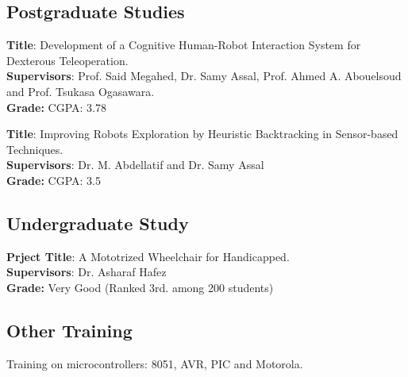 \documentclass[
  a4paper,
   maincolor=cvblue,
   sectioncolor=cvblue,
]{fortysecondscv}
\begin{document}
\subsection{Postgraduate Studies}
\begin{cvtable}
		{\textbf{Title}: Development of a Cognitive Human-Robot Interaction System for Dexterous Teleoperation.\\
		\textbf{Supervisors}: Prof. Said Megahed, Dr. Samy Assal, Prof. Ahmed A. Abouelsoud and Prof. Tsukasa Ogasawara.\\
		\textbf{Grade: }CGPA: 3.78\\
		   }

		{\textbf{Title}: Improving Robots Exploration by Heuristic Backtracking in Sensor-based Techniques.\\
		\textbf{Supervisors}: Dr. M. Abdellatif and Dr. Samy Assal\\
		\textbf{Grade: }CGPA: 3.5\\
	   }
\end{cvtable}


\subsection{Undergraduate Study}
\begin{cvtable}
		{\textbf{Prject Title}: A Mototrized Wheelchair for Handicapped.\\
		\textbf{Supervisors}: Dr. Asharaf Hafez\\
		\textbf{Grade: } Very Good (Ranked 3rd. among 200 students)}
	\end{cvtable}

\subsection{Other Training}
\begin{cvtable}
		{Training on microcontrollers: 8051, AVR, PIC and Motorola.}
	\end{cvtable}
\end{document}
